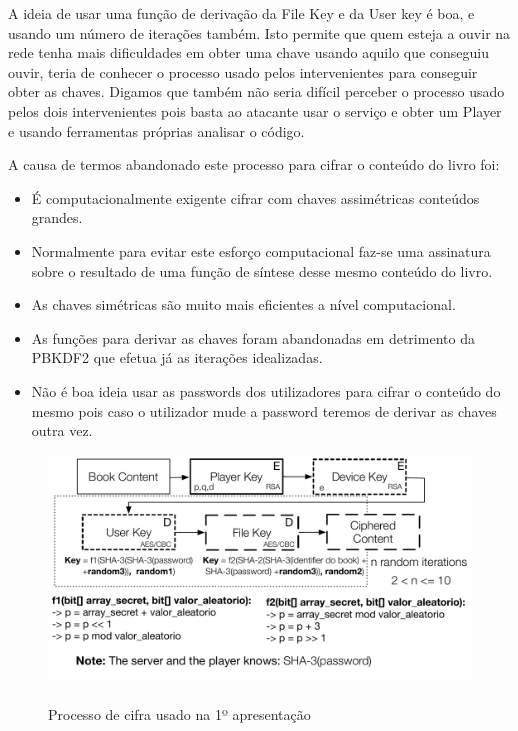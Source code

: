 \documentclass[pdftex,12pt,a4paper]{report}
\begin{document}
A ideia de usar uma função de derivação da File Key e da User key é boa, e usando um número de iterações também. Isto permite que quem esteja a ouvir na rede tenha mais dificuldades em obter uma chave usando aquilo que conseguiu ouvir, teria de conhecer o processo usado pelos intervenientes para conseguir obter as chaves. Digamos que também não seria difícil perceber o processo usado pelos dois intervenientes pois basta ao atacante usar o serviço e obter um Player e usando ferramentas próprias analisar o código.

A causa de termos abandonado este processo para cifrar o conteúdo do livro foi:

\begin{itemize}  
        \item É computacionalmente exigente cifrar com chaves assimétricas conteúdos grandes.
        \item Normalmente para evitar este esforço computacional faz-se uma assinatura sobre o resultado de uma função de síntese desse mesmo conteúdo do livro.
        \item As chaves simétricas são muito mais eficientes a nível computacional.
        \item As funções para derivar as chaves foram abandonadas em detrimento da PBKDF2 que efetua já as iterações idealizadas.
        \item Não é boa ideia usar as passwords dos utilizadores para cifrar o conteúdo do mesmo pois caso o utilizador mude a password teremos de derivar as chaves outra vez.
\pagebreak
                
\end{itemize}

\begin{figure}[!htb]
\center
 \includegraphics[width=135mm,scale=1]{filekey-initial-crypt.pdf}
 \caption{\\Processo de cifra usado na 1º apresentação}\label{fig:eer}
\end{figure}
\end{document}
